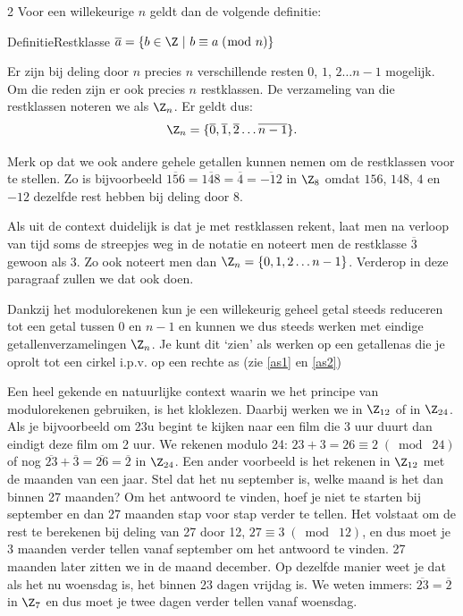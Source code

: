 \begin{multicols}{2}
	Voor een willekeurige $n$ geldt dan de volgende definitie:
	\begin{kader}{Definitie}{Restklasse}
		$\overline{a}=\{ b\in \Z \ |\ b\equiv a \;(\bmod\; n)\}$
	\end{kader}
	
	Er zijn bij deling door $n$ precies $n$ verschillende resten $0$, $1$, $2 \ldots n-1$ mogelijk. Om die reden zijn er ook precies $n$ restklassen. De verzameling van die restklassen noteren we als $\Z_n$. Er geldt dus: $$ \Z_n=\{\overline{0},\overline{1}, \overline{2} \ldots \overline{n-1}\}.$$
	
	Merk op dat we ook andere gehele getallen kunnen nemen om de restklassen voor te stellen. Zo is bijvoorbeeld $\overline{156}=\overline{148}=\overline{4}=\overline{-12}$ in $\Z_8$ omdat $156$, $148$, $4$ en $-12$ dezelfde rest hebben bij deling door $8$.
	
	Als uit de context duidelijk is dat je met restklassen rekent, laat men na verloop van tijd soms de streepjes weg in de notatie en noteert men de restklasse $\overline{3}$ gewoon als $3$. Zo ook noteert men dan $\Z_n=\{0,1,2\ldots n-1\}$. Verderop in deze paragraaf zullen we dat ook doen.
	
	
	Dankzij het modulorekenen kun je een willekeurig geheel getal steeds reduceren tot een getal tussen $0$ en $n-1$ en kunnen we dus steeds werken met eindige getallenverzamelingen $\Z_n$.
	Je kunt dit `zien' als werken op een getallenas die je oprolt tot een cirkel i.p.v. op een rechte as (zie \autoref{as1} en \autoref{as2})
	
	
		
	Een heel gekende en natuurlijke context waarin we het principe van modulorekenen gebruiken, is het kloklezen. Daarbij werken we in $\Z_{12}$ of in $\Z_{24}$. Als je bijvoorbeeld om 23u begint te kijken naar een film die 3 uur duurt dan eindigt deze film om 2 uur. We rekenen modulo 24: $23+3=26\equiv 2 \;(\bmod\; 24)$ of nog $\overline{23}+\overline{3}=\overline{26}=\overline{2}$ in $\Z_{24}$. Een ander voorbeeld is het rekenen in $\Z_{12}$ met de maanden van een jaar. Stel dat het nu september is, welke maand is het dan binnen 27 maanden? Om het antwoord te vinden, hoef je niet te starten bij september en dan 27 maanden stap voor stap verder te tellen. Het volstaat om de rest te berekenen bij deling van 27 door 12, $27\equiv 3 \;(\bmod\; 12)$, en dus moet je 3 maanden verder tellen vanaf september om het antwoord te vinden. 27 maanden later zitten we in de maand december. Op dezelfde manier weet je dat als het nu woensdag is, het binnen 23 dagen vrijdag is. We weten immers: $\overline{23}=\overline{2}$ in $\Z_7$ en dus moet je twee dagen verder tellen vanaf woensdag. 


\end{multicols}
